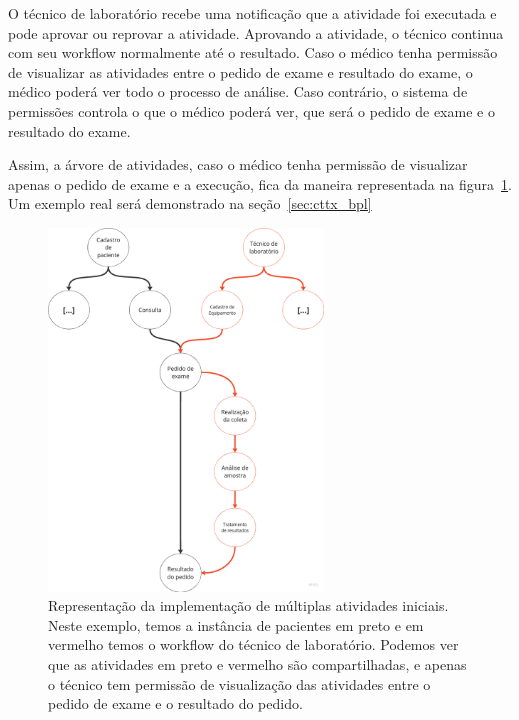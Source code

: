 O técnico de laboratório recebe uma notificação que a atividade foi executada e pode aprovar ou reprovar a atividade.
Aprovando a atividade, o técnico continua com seu workflow normalmente até o resultado.
Caso o médico tenha permissão de visualizar as atividades entre o pedido de exame e resultado do exame, o médico poderá ver todo o processo de análise.
Caso contrário, o sistema de permissões controla o que o médico poderá ver, que será o pedido de exame e o resultado do exame.

Assim, a árvore de atividades, caso o médico tenha permissão de visualizar apenas o pedido de exame e a execução, fica da maneira representada na figura~\ref{fig:segunda_implementacao}. Um exemplo real será demonstrado na seção~\ref{sec:cttx_bpl}

\begin{figure}
    \centering
    \includegraphics[width=0.65\textwidth]{imgs/Exemplo/exemplo_pedido_exame.png}
    \caption{Representação da implementação de múltiplas atividades iniciais. Neste exemplo, temos a instância de pacientes em preto e em vermelho temos o workflow do técnico de laboratório. Podemos ver que as atividades em preto e vermelho são compartilhadas, e apenas o técnico tem permissão de visualização das atividades entre o pedido de exame e o resultado do pedido.}
    \label{fig:segunda_implementacao}
\end{figure}


